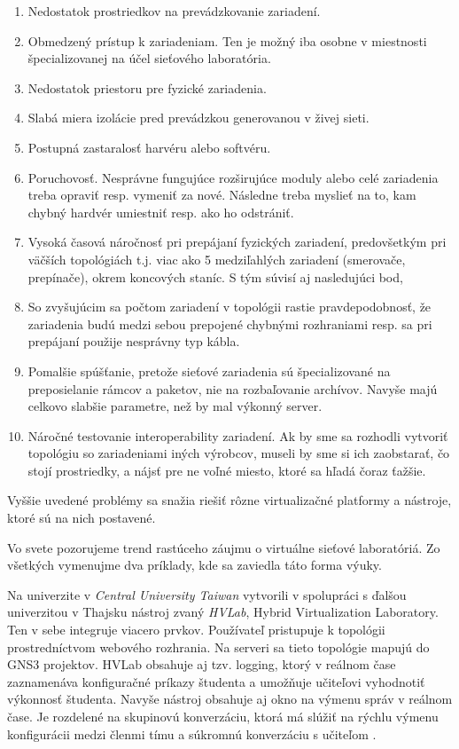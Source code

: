 \begin{enumerate}
    \item Nedostatok prostriedkov na prevádzkovanie zariadení.
    \item Obmedzený prístup k zariadeniam. Ten je možný iba osobne v miestnosti špecializovanej na účel sieťového laboratória.
    \item Nedostatok priestoru pre fyzické zariadenia.
    \item Slabá miera izolácie pred prevádzkou generovanou v živej sieti.
    \item Postupná zastaralosť harvéru alebo softvéru.
    \item Poruchovosť. Nesprávne fungujúce rozširujúce moduly alebo celé zariadenia treba opraviť resp. vymeniť za nové. Následne treba myslieť na to, kam chybný hardvér umiestniť resp. ako ho odstrániť.
    \item Vysoká časová náročnosť pri prepájaní fyzických zariadení, predovšetkým pri väčších topológiách t.j. viac ako 5 medziľahlých zariadení (smerovače, prepínače), okrem koncových staníc. S tým súvisí aj nasledujúci bod,
    \item So zvyšujúcim sa počtom zariadení v topológii rastie pravdepodobnosť, že zariadenia budú medzi sebou prepojené chybnými rozhraniami resp. sa pri prepájaní použije nesprávny typ kábla.
    \item Pomalšie spúšťanie, pretože sieťové zariadenia sú špecializované na preposielanie rámcov a paketov, nie na rozbaľovanie archívov. Navyše majú celkovo slabšie parametre, než by mal výkonný server.
    \item Náročné testovanie interoperability zariadení. Ak by sme sa rozhodli vytvoriť topológiu so zariadeniami iných výrobcov, museli by sme si ich zaobstarať, čo stojí prostriedky, a nájsť pre ne voľné miesto, ktoré sa hľadá čoraz ťažšie.
\end{enumerate}

Vyššie uvedené problémy sa snažia riešiť rôzne virtualizačné platformy a nástroje, ktoré sú na nich postavené.

Vo svete pozorujeme trend rastúceho záujmu o virtuálne sieťové laboratóriá. Zo všetkých vymenujme dva príklady, kde sa zaviedla táto forma výuky.

Na univerzite v \emph{Central University Taiwan} vytvorili v spolupráci s ďalšou univerzitou v Thajsku nástroj zvaný \emph{HVLab}, Hybrid Virtualization Laboratory. Ten v sebe integruje viacero prvkov. Používateľ pristupuje k topológii prostredníctvom webového rozhrania. Na serveri sa tieto topológie mapujú do GNS3 projektov. HVLab obsahuje aj tzv. logging, ktorý v reálnom čase zaznamenáva konfiguračné príkazy študenta a umožňuje učiteľovi vyhodnotiť výkonnosť študenta. Navyše nástroj obsahuje aj okno na výmenu správ v reálnom čase. Je rozdelené na skupinovú konverzáciu, ktorá má slúžiť na rýchlu výmenu konfigurácii medzi členmi tímu a súkromnú konverzáciu s učiteľom \cite{hvlab}.

